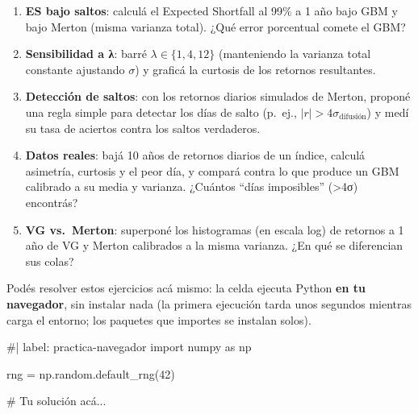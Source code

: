 \documentclass[
  spanish,
  letterpaper,
  DIV=11,
  numbers=noendperiod]{scrreprt}
\newenvironment{Shaded}{\begin{snugshade}}{\end{snugshade}}
\newcommand{\NormalTok}[1]{\textcolor[rgb]{0.00,0.23,0.31}{#1}}
\providecommand{\tightlist}{%
  \setlength{\itemsep}{0pt}\setlength{\parskip}{0pt}}
\begin{document}
\begin{tcolorbox}[enhanced jigsaw, bottomrule=.15mm, colback=white, opacitybacktitle=0.6, arc=.35mm, toprule=.15mm, opacityback=0, breakable, titlerule=0mm, left=2mm, coltitle=black, colbacktitle=quarto-callout-important-color!10!white, colframe=quarto-callout-important-color-frame, leftrule=.75mm, toptitle=1mm, bottomtitle=1mm, title=\textcolor{quarto-callout-important-color}{\faExclamation}\hspace{0.5em}{Ejercicios}, rightrule=.15mm]

\begin{enumerate}
\def\labelenumi{\arabic{enumi}.}
\tightlist
\item
  \textbf{ES bajo saltos}: calculá el Expected Shortfall al 99\% a 1 año
  bajo GBM y bajo Merton (misma varianza total). ¿Qué error porcentual
  comete el GBM?
\item
  \textbf{Sensibilidad a λ}: barré \(\lambda \in \{1, 4, 12\}\)
  (manteniendo la varianza total constante ajustando \(\sigma\)) y
  graficá la curtosis de los retornos resultantes.
\item
  \textbf{Detección de saltos}: con los retornos diarios simulados de
  Merton, proponé una regla simple para detectar los días de salto
  (p.~ej., \(|r| > 4\sigma_{\text{difusión}}\)) y medí su tasa de
  aciertos contra los saltos verdaderos.
\item
  \textbf{Datos reales}: bajá 10 años de retornos diarios de un índice,
  calculá asimetría, curtosis y el peor día, y compará contra lo que
  produce un GBM calibrado a su media y varianza. ¿Cuántos ``días
  imposibles'' (\textgreater4σ) encontrás?
\item
  \textbf{VG vs.~Merton}: superponé los histogramas (en escala log) de
  retornos a 1 año de VG y Merton calibrados a la misma varianza. ¿En
  qué se diferencian sus colas?
\end{enumerate}

\end{tcolorbox}

Podés resolver estos ejercicios acá mismo: la celda ejecuta Python
\textbf{en tu navegador}, sin instalar nada (la primera ejecución tarda
unos segundos mientras carga el entorno; los paquetes que importes se
instalan solos).

\begin{Shaded}
\begin{Highlighting}[]
\NormalTok{\#| label: practica{-}navegador}
\NormalTok{import numpy as np}

\NormalTok{rng = np.random.default\_rng(42)}

\NormalTok{\# Tu solución acá...}
\end{Highlighting}
\end{Shaded}
\end{document}
